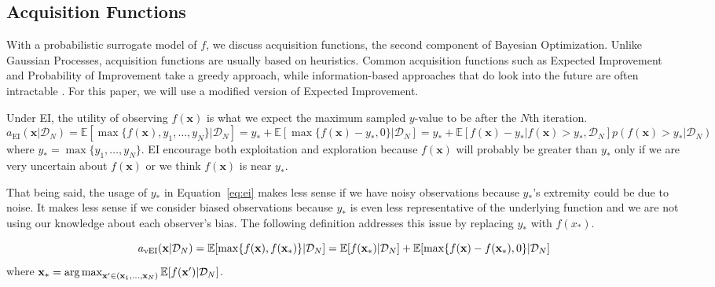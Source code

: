 \subsection{Acquisition Functions}

With a probabilistic surrogate model of $f$, we discuss acquisition functions, the second component of Bayesian Optimization.
Unlike Gaussian Processes, acquisition functions are usually based on heuristics.
Common acquisition functions such as Expected Improvement and Probability of Improvement take a greedy approach, while information-based approaches that do look into the future are often intractable \cite{shahriari2016}.
For this paper, we will use a modified version of Expected Improvement.

Under EI, the utility of observing $f(\mathbf{x})$ is what we expect the maximum sampled $y$-value to be after the $N$th iteration.
\begin{equation}
    \label{eq:ei}
    a_{\mathrm{EI}}(\mathbf{x} | \mathcal{D}_N) = \mathbb{E}[\max\{f(\mathbf{x}), y_1, \dots, y_N\} | \mathcal{D}_N]
    = y_* + \mathbb{E}[\max\{f(\mathbf{x}) - y_*, 0\} |\mathcal{D}_N]
    = y_* + \mathbb{E}[f(\mathbf{x}) - y_* | f(\mathbf{x}) > y_*, \mathcal{D}_N]p(f(\mathbf{x}) > y_* | \mathcal{D}_N)
\end{equation}
where $y_* = \max\{y_1, \dots, y_N\}$.
EI encourage both exploitation and exploration because $f(\mathbf{x})$ will probably be greater than $y_*$
only if we are very uncertain about $f(\mathbf{x})$ or we think $f(\mathbf{x})$ is near $y_*$.

That being said, the usage of $y_*$ in Equation~\ref{eq:ei} makes less sense if we have noisy observations because $y_*$'s extremity could be due to noise.
It makes less sense if we consider biased observations because $y_*$ is even less representative of the underlying function and we are not using our knowledge about each observer's bias.
The following definition addresses this issue by replacing $y_*$ with $f(x_*)$.

\begin{definition}[vEI]
    \begin{equation}
        \label{eq:vei}
        a_{\mathrm{vEI}}(\mathbf{x} | \mathcal{D}_N) = \mathbb{E}[\max \{ f(\mathbf{x}), f(\mathbf{x}_*) \} | \mathcal{D}_N]
        = \mathbb{E}[f(\mathbf{x}_*) | \mathcal{D}_N] + \mathbb{E}[\max \{ f(\mathbf{x}) - f(\mathbf{x}_*), 0 \} | \mathcal{D}_N]
    \end{equation}
    where $\mathbf{x}_* = \operatorname*{arg\,max}_{\mathbf{x'} \in (\mathbf{x}_1, \dots, \mathbf{x}_N)} \mathbb{E}[f(\mathbf{x'}) | \mathcal{D}_N]$.
\end{definition}

